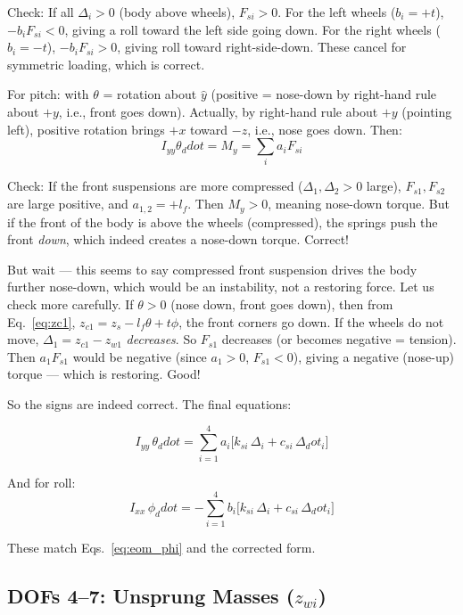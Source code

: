 \documentclass[11pt]{article}
\def\ddot#1{#1_ddot}%
\def\dot#1{#1_dot}%
\begin{document}
Check: If all $\Delta_i > 0$ (body above wheels), $F_{si}>0$. For the left wheels ($b_i = +t$), $-b_i F_{si} < 0$, giving a roll toward the left side going down. For the right wheels ($b_i = -t$), $-b_i F_{si} > 0$, giving roll toward right-side-down. These cancel for symmetric loading, which is correct.

For pitch: with $\theta$ = rotation about $\hat{y}$ (positive = nose-down by right-hand rule about $+y$, i.e., front goes down). Actually, by right-hand rule about $+y$ (pointing left), positive rotation brings $+x$ toward $-z$, i.e., nose goes down. Then:
\[
I_{yy}\ddot\theta = M_y = \sum_i a_i F_{si}
\]

Check: If the front suspensions are more compressed ($\Delta_1, \Delta_2 > 0$ large), $F_{s1}, F_{s2}$ are large positive, and $a_{1,2} = +l_f$. Then $M_y > 0$, meaning nose-down torque. But if the front of the body is above the wheels (compressed), the springs push the front \emph{down}, which indeed creates a nose-down torque. Correct!

But wait --- this seems to say compressed front suspension drives the body further nose-down, which would be an instability, not a restoring force. Let us check more carefully. If $\theta > 0$ (nose down, front goes down), then from Eq.~\eqref{eq:zc1}, $z_{c1} = z_s - l_f\theta + t\phi$, the front corners go down. If the wheels do not move, $\Delta_1 = z_{c1} - z_{w1}$ \emph{decreases}. So $F_{s1}$ decreases (or becomes negative = tension). Then $a_1 F_{s1}$ would be negative (since $a_1>0$, $F_{s1}<0$), giving a negative (nose-up) torque --- which is restoring. Good!

So the signs are indeed correct. The final equations:

\begin{equation}
\boxed{I_{yy}\,\ddot{\theta} = \sum_{i=1}^{4} a_i\bigl[k_{si}\,\Delta_i + c_{si}\,\dot{\Delta}_i\bigr]}
\label{eq:eom_theta_final}
\end{equation}

And for roll:
\begin{equation}
\boxed{I_{xx}\,\ddot{\phi} = -\sum_{i=1}^{4} b_i\bigl[k_{si}\,\Delta_i + c_{si}\,\dot{\Delta}_i\bigr]}
\label{eq:eom_phi_final}
\end{equation}

These match Eqs.~\eqref{eq:eom_phi} and the corrected form.

\subsection{DOFs 4--7: Unsprung Masses ($z_{wi}$)}
\end{document}
